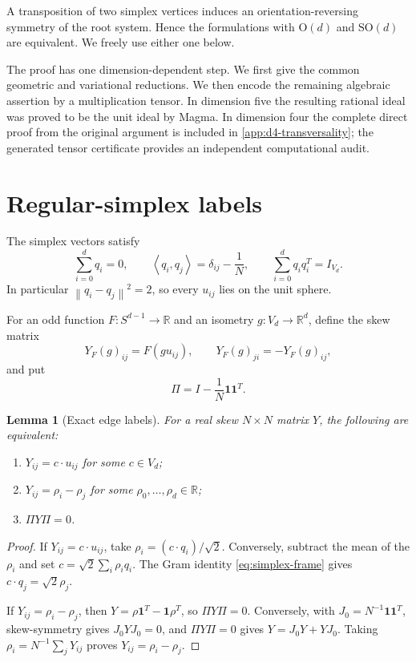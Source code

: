 \documentclass[11pt,reqno]{amsart}
\newtheorem{lemma}[theorem]{Lemma}
\theoremstyle{remark}
\newcommand{\R}{\mathbb R}
\newcommand{\one}{\mathbf 1}
\newcommand{\SO}{\mathrm{SO}}
\newcommand{\ip}[2]{\left\langle #1,#2\right\rangle}
\newcommand{\norm}[1]{\left\lVert #1\right\rVert}
\begin{document}
A transposition of two simplex vertices induces an orientation-reversing
symmetry of the root system.  Hence the formulations with $\mathrm O(d)$ and
$\SO(d)$ are equivalent.  We freely use either one below.

The proof has one dimension-dependent step.  We first give the common
geometric and variational reductions.  We then encode the remaining
algebraic assertion by a multiplication tensor.  In dimension five the
resulting rational ideal was proved to be the unit ideal by Magma.  In
dimension four the complete direct proof from the original argument is
included in \cref{app:d4-transversality}; the generated tensor certificate
provides an independent computational audit.

\section{Regular-simplex labels}\label{sec:labels}

The simplex vectors satisfy
\begin{equation}\label{eq:simplex-frame}
 \sum_{i=0}^{d}q_i=0,
 \qquad
 \ip{q_i}{q_j}=\delta_{ij}-\frac1N,
 \qquad
 \sum_{i=0}^{d}q_iq_i^T=I_{V_d}.
\end{equation}
In particular $\norm{q_i-q_j}^2=2$, so every $u_{ij}$ lies on the unit
sphere.

For an odd function $F:S^{d-1}\to\R$ and an isometry
$g:V_d\to\R^d$, define the skew matrix
\begin{equation}\label{eq:label-matrix}
 Y_F(g)_{ij}=F(gu_{ij}),
 \qquad Y_F(g)_{ji}=-Y_F(g)_{ij},
\end{equation}
and put
\[
 \Pi=I-\frac1N\one\one^T.
\]

\begin{lemma}[Exact edge labels]\label{lem:exact-labels}
For a real skew $N\times N$ matrix $Y$, the following are equivalent:
\begin{enumerate}
\item $Y_{ij}=c\cdot u_{ij}$ for some $c\in V_d$;
\item $Y_{ij}=\rho_i-\rho_j$ for some $\rho_0,\ldots,\rho_d\in\R$;
\item $\Pi Y\Pi=0$.
\end{enumerate}
\end{lemma}

\begin{proof}
If $Y_{ij}=c\cdot u_{ij}$, take
$\rho_i=(c\cdot q_i)/\sqrt2$.  Conversely, subtract the mean of the
$\rho_i$ and set $c=\sqrt2\sum_i\rho_iq_i$.  The Gram identity
\eqref{eq:simplex-frame} gives $c\cdot q_j=\sqrt2\rho_j$.

If $Y_{ij}=\rho_i-\rho_j$, then
$Y=\rho\one^T-\one\rho^T$, so $\Pi Y\Pi=0$.  Conversely, with
$J_0=N^{-1}\one\one^T$, skew-symmetry gives $J_0YJ_0=0$, and
$\Pi Y\Pi=0$ gives $Y=J_0Y+YJ_0$.  Taking
$\rho_i=N^{-1}\sum_jY_{ij}$ proves $Y_{ij}=\rho_i-\rho_j$.
\end{proof}
\end{document}
